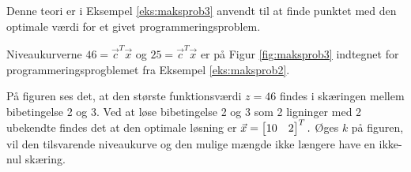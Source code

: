 %

Denne teori er i Eksempel \ref{eks:maksprob3} anvendt til at finde punktet med den optimale værdi for et givet programmeringsproblem.

\begin{eks}
Niveaukurverne $46=\vec{c}^T \vec{x}$ og $25=\vec{c}^T \vec{x}$ er på Figur \ref{fig:maksprob3} indtegnet for programmeringsprogblemet fra Eksempel \ref{eks:maksprob2}.

	\begin{center}	
		
		\label{fig:maksprob3}
	\end{center}
	
På figuren ses det, at den største funktionsværdi $z=46$ findes i skæringen mellem bibetingelse 2 og 3.
Ved at løse bibetingelse 2 og 3 som 2 ligninger med 2 ubekendte findes det at den optimale løsning er $\vec{x}=\begin{bmatrix} 10 & 2 \end{bmatrix}^T.$
Øges $k$ på figuren, vil den tilsvarende niveaukurve og den mulige mængde ikke længere have en ikke-nul skæring. 

\label{eks:maksprob3}
\end{eks}





